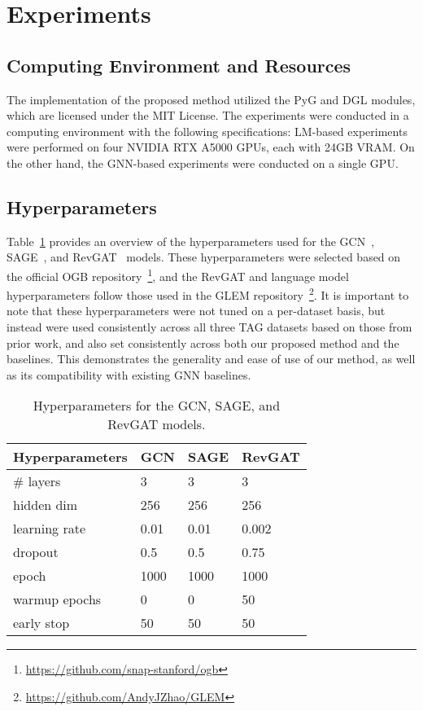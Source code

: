 \documentclass{article}
\begin{document}
\section{Experiments}\label{app sec: experiment}

\subsection{Computing Environment and Resources}
The implementation of the proposed method utilized the PyG and DGL modules, which are licensed under the MIT License. The experiments were conducted in a computing environment with the following specifications: LM-based experiments were performed on four NVIDIA RTX A5000 GPUs, each with 24GB VRAM. On the other hand, the GNN-based experiments were conducted on a single GPU.

\subsection{Hyperparameters}

Table~\ref{tab: hyperparam} provides an overview of the hyperparameters used for the GCN~\citep{kipf2016semi_gcn}, SAGE~\citep{hamilton2017inductive_sage}, and RevGAT~\citep{li2021training_revgat} models. These hyperparameters were selected based on the official OGB repository~\footnote{\url{https://github.com/snap-stanford/ogb}}, and the RevGAT and language model hyperparameters follow those used in the GLEM repository~\footnote{\url{https://github.com/AndyJZhao/GLEM}}. It is important to note that these hyperparameters were not tuned on a per-dataset basis, but instead were used consistently across all three TAG datasets based on those from prior work, and also set consistently across both our proposed method and the baselines. This demonstrates the generality and ease of use of our method, as well as its compatibility with existing GNN baselines.

\begin{table}[!ht]
    \centering
    \small
    \caption{Hyperparameters for the GCN, SAGE, and RevGAT models.}
    \label{tab: hyperparam}
\begin{tabular}{m{4cm}m{2cm}m{2cm}m{2cm}}
    \toprule
Hyperparameters & GCN& SAGE&RevGAT\\
\midrule
\# layers & 3 & 3 & 3\\
hidden dim & 256 & 256 & 256 \\
learning rate & 0.01 & 0.01 & 0.002\\
dropout & 0.5 & 0.5 & 0.75\\
epoch & 1000 & 1000 & 1000\\
warmup epochs & 0 & 0 & 50\\
early stop & 50 & 50 & 50\\
\bottomrule
\end{tabular}
\end{table}
\end{document}
